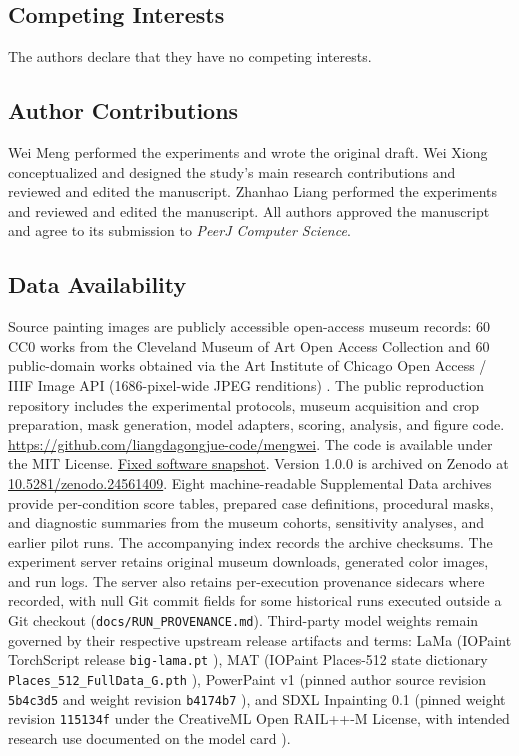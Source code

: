 \documentclass[fleqn,12pt,lineno]{wlpeerj}
\begin{document}
\subsection*{Competing Interests}
The authors declare that they have no competing interests.

\subsection*{Author Contributions}
Wei Meng performed the experiments and wrote the original draft. Wei Xiong conceptualized and designed the study's main research contributions and reviewed and edited the manuscript. Zhanhao Liang performed the experiments and reviewed and edited the manuscript. All authors approved the manuscript and agree to its submission to \textit{PeerJ Computer Science}.

\subsection*{Data Availability}
Source painting images are publicly accessible open-access museum records: 60 CC0 works from the Cleveland Museum of Art Open Access Collection \citetext{\citeauthor{cma-openaccess}, n.d.} and 60 public-domain works obtained via the Art Institute of Chicago Open Access / IIIF Image API (1686-pixel-wide JPEG renditions) \citetext{\citeauthor{aic-openaccess}, n.d.}. The public reproduction repository includes the experimental protocols, museum acquisition and crop preparation, mask generation, model adapters, scoring, analysis, and figure code. \url{https://github.com/liangdagongjue-code/mengwei}. The code is available under the MIT License. \href{https://github.com/liangdagongjue-code/mengwei/tree/0b3417599e6dfd88b9597789cfca762a91c66251}{Fixed software snapshot}. Version 1.0.0 is archived on Zenodo at \href{https://doi.org/10.5281/zenodo.24561409}{10.5281/zenodo.24561409}. Eight machine-readable Supplemental Data archives provide per-condition score tables, prepared case definitions, procedural masks, and diagnostic summaries from the museum cohorts, sensitivity analyses, and earlier pilot runs. The accompanying index records the archive checksums. The experiment server retains original museum downloads, generated color images, and run logs. The server also retains per-execution provenance sidecars where recorded, with null Git commit fields for some historical runs executed outside a Git checkout (\nolinkurl{docs/RUN_PROVENANCE.md}). Third-party model weights remain governed by their respective upstream release artifacts and terms: LaMa (IOPaint TorchScript release \texttt{big-lama.pt} \citep{suvorov2021, lamaweights}), MAT (IOPaint Places-512 state dictionary \nolinkurl{Places_512_FullData_G.pth} \citep{li2022mat, matweights}), PowerPaint v1 (pinned author source revision \texttt{5b4c3d5} and weight revision \texttt{b4174b7} \citep{zhuang2023, powerpaintv1src, powerpaintv1weights}), and SDXL Inpainting 0.1 (pinned weight revision \texttt{115134f} under the CreativeML Open RAIL++-M License, with intended research use documented on the model card \citep{sdxlinpaint, sdxlinpaintweights}).
\end{document}

